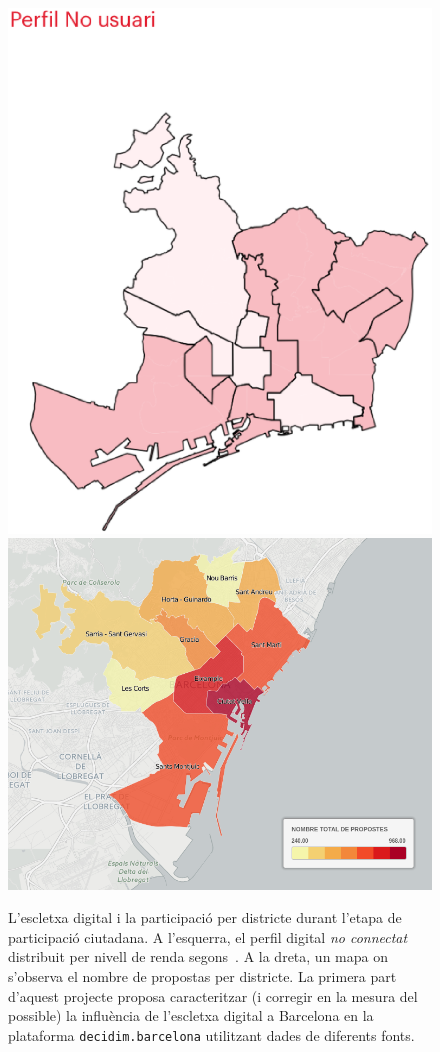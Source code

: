 \documentclass[final,10pt]{article}
\begin{document}
\begin{figure}[t!]
\centering
\includegraphics[width=.49\columnwidth]{fig_excletxa}
\includegraphics[width=.49\columnwidth]{fig_proposals}
\caption{\label{fig:task1} 
L'escletxa digital i la participaci\'o per districte durant l'etapa de participaci\'o ciutadana.
A l'esquerra, el perfil digital \emph{no connectat} distribuit per nivell de renda segons~\cite{digital}.
A la dreta, un mapa on s'observa el nombre de propostas per districte.
La primera part d'aquest projecte proposa caracteritzar (i corregir en la mesura del possible)
la influ\`encia de l'escletxa digital a Barcelona en la plataforma \texttt{decidim.barcelona}
utilitzant dades de diferents fonts.}
\end{figure}
\end{document}
